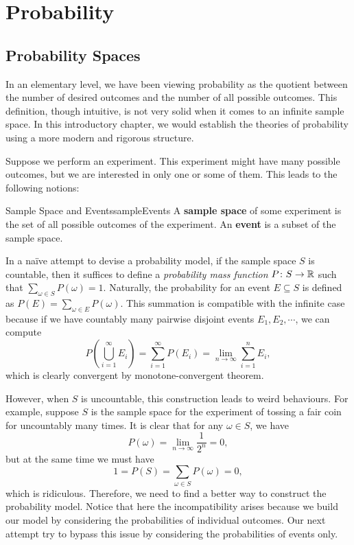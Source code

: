 \documentclass[math, code]{amznotes}
\theoremstyle{remark}
\begin{document}
\tableofcontents

\chapter{Probability}
\section{Probability Spaces}
In an elementary level, we have been viewing probability as the quotient between the number of desired outcomes and the number of all possible outcomes. This definition, though intuitive, is not very solid when it comes to an infinite sample space. In this introductory chapter, we would establish the theories of probability using a more modern and rigorous structure.

Suppose we perform an experiment. This experiment might have many possible outcomes, but we are interested in only one or some of them. This leads to the following notions:
\begin{dfnbox}{Sample Space and Events}{sampleEvents}
    A {\color{red} \textbf{sample space}} of some experiment is the set of all possible outcomes of the experiment. An {\color{red} \textbf{event}} is a subset of the sample space.
\end{dfnbox}
In a na\"{i}ve attempt to devise a probability model, if the sample space $S$ is countable, then it suffices to define a \textit{probability mass function} $P \colon S \to \mathbb{R}$ such that $\sum_{\omega \in S}P\left(\omega\right) = 1$. Naturally, the probability for an event $E \subseteq S$ is defined as $P\left(E\right) = \sum_{\omega \in E}P\left(\omega\right)$. This summation is compatible with the infinite case because if we have countably many pairwise disjoint events $E_1, E_2, \cdots$, we can compute 
\begin{equation*}
    P\left(\bigcup_{i = 1}^{\infty}E_i\right) = \sum_{i = 1}^{\infty}P\left(E_i\right) = \lim_{n \to \infty}\sum_{i = 1}^{n}E_i,
\end{equation*}
which is clearly convergent by monotone-convergent theorem.

However, when $S$ is uncountable, this construction leads to weird behaviours. For example, suppose $S$ is the sample space for the experiment of tossing a fair coin for uncountably many times. It is clear that for any $\omega \in S$, we have 
\begin{equation*}
    P\left(\omega\right) = \lim_{n \to \infty}\frac{1}{2^{n}} = 0,
\end{equation*}
but at the same time we must have 
\begin{equation*}
    1 = P\left(S\right) = \sum_{\omega \in S}P\left(\omega\right) = 0,
\end{equation*}
which is ridiculous. Therefore, we need to find a better way to construct the probability model. Notice that here the incompatibility arises because we build our model by considering the probabilities of individual outcomes. Our next attempt try to bypass this issue by considering the probabilities of events only.
\end{document}

